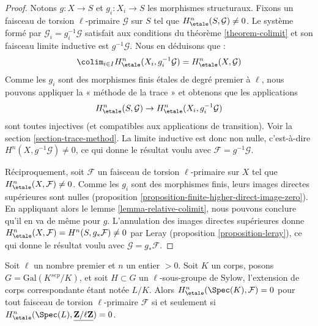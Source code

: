 \begin{proof}
Notons $g : X \to S$ et $g_i : X_i \to S$ les morphismes structuraux.
Fixons un faisceau de torsion $\ell$-primaire $\mathcal{G}$ sur $S$
tel que $H^n_\etale(S, \mathcal{G}) \not = 0$.
Le syst\`eme form\'e par $\mathcal{G}_i = g_i^{-1}\mathcal{G}$
satisfait aux conditions du th\'eor\`eme \ref{theorem-colimit}
et son faisceau limite inductive est $g^{-1}\mathcal{G}$. Nous en
d\'eduisons que :
$$
\colim_{i\in I} H^n_\etale(X_i, g_i^{-1}\mathcal{G}) =
H^n_\etale(X, \mathcal{G})
$$
Comme les $g_i$ sont des morphismes finis \'etales de degr\'e premier
\`a $\ell$, nous pouvons appliquer la « m\'ethode de la trace » et obtenons que
les applications
$$
H^n_\etale(S, \mathcal{G}) \to H^n_\etale(X_i, g_i^{-1}\mathcal{G})
$$
sont toutes injectives (et compatibles aux applications de transition).
Voir la section \ref{section-trace-method}. La limite inductive est donc non nulle, c'est-\`a-dire
$H^n(X,g^{-1}\mathcal{G}) \neq 0$, ce qui donne le r\'esultat voulu avec
$\mathcal{F} = g^{-1}\mathcal{G}$.

\medskip\noindent
R\'eciproquement, soit $\mathcal{F}$ un faisceau de torsion $\ell$-primaire sur $X$
tel que $H^n_\etale(X, \mathcal{F}) \not = 0$. Comme les $g_i$
sont des morphismes finis, leurs images directes sup\'erieures sont nulles
(proposition \ref{proposition-finite-higher-direct-image-zero}).
En appliquant alors le lemme \ref{lemma-relative-colimit},
nous pouvons conclure qu'il en va de m\^eme pour $g$.
L'annulation des images directes sup\'erieures donne
$H^n_\etale(X, \mathcal{F}) = H^n(S, g_*\mathcal{F}) \neq 0$
par Leray (proposition \ref{proposition-leray}),
ce qui donne le r\'esultat voulu avec $\mathcal{G} = g_*\mathcal{F}$.
\end{proof}

\begin{lemma}
\label{lemma-reduce-to-l-group}
Soit $\ell$ un nombre premier et $n$ un entier $> 0$.
Soit $K$ un corps, posons $G = \text{Gal}(K^{sep}/K)$, et soit
$H \subset G$ un $\ell$-sous-groupe de Sylow, l'extension de corps
correspondante \'etant not\'ee $L/K$. Alors
$H^n_\etale(\Spec(K), \mathcal{F}) = 0$ pour tout faisceau
de torsion $\ell$-primaire $\mathcal{F}$ si et seulement si
$H^n_\etale(\Spec(L), \underline{\mathbf{Z}/\ell\mathbf{Z}}) = 0$.
\end{lemma}


